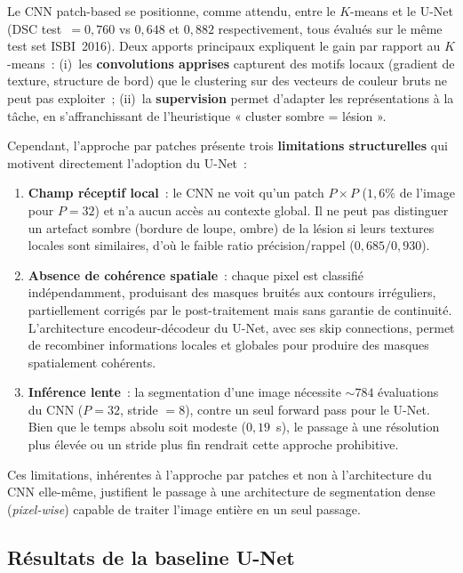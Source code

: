 \documentclass[12pt,a4paper]{article}
\begin{document}
Le CNN patch-based se positionne, comme attendu, entre le $K$-means et le U-Net (DSC test~$= 0{,}760$ vs $0{,}648$ et $0{,}882$ respectivement, tous évalués sur le même test set ISBI~2016). Deux apports principaux expliquent le gain par rapport au $K$-means~: (i)~les \textbf{convolutions apprises} capturent des motifs locaux (gradient de texture, structure de bord) que le clustering sur des vecteurs de couleur bruts ne peut pas exploiter~; (ii)~la \textbf{supervision} permet d'adapter les représentations à la tâche, en s'affranchissant de l'heuristique « cluster sombre = lésion ».

Cependant, l'approche par patches présente trois \textbf{limitations structurelles} qui motivent directement l'adoption du U-Net~:
\begin{enumerate}[nosep]
    \item \textbf{Champ réceptif local}~: le CNN ne voit qu'un patch $P \times P$ ($1{,}6\%$ de l'image pour $P = 32$) et n'a aucun accès au contexte global. Il ne peut pas distinguer un artefact sombre (bordure de loupe, ombre) de la lésion si leurs textures locales sont similaires, d'où le faible ratio précision/rappel ($0{,}685/0{,}930$).
    \item \textbf{Absence de cohérence spatiale}~: chaque pixel est classifié indépendamment, produisant des masques bruités aux contours irréguliers, partiellement corrigés par le post-traitement mais sans garantie de continuité. L'architecture encodeur-décodeur du U-Net, avec ses skip connections, permet de recombiner informations locales et globales pour produire des masques spatialement cohérents.
    \item \textbf{Inférence lente}~: la segmentation d'une image nécessite $\sim 784$ évaluations du CNN ($P = 32$, stride $= 8$), contre un seul forward pass pour le U-Net. Bien que le temps absolu soit modeste ($0{,}19$~s), le passage à une résolution plus élevée ou un stride plus fin rendrait cette approche prohibitive.
\end{enumerate}

Ces limitations, inhérentes à l'approche par patches et non à l'architecture du CNN elle-même, justifient le passage à une architecture de segmentation dense (\emph{pixel-wise}) capable de traiter l'image entière en un seul passage.

\subsection{Résultats de la baseline U-Net}
\label{subsec:baseline_unet}
\end{document}
